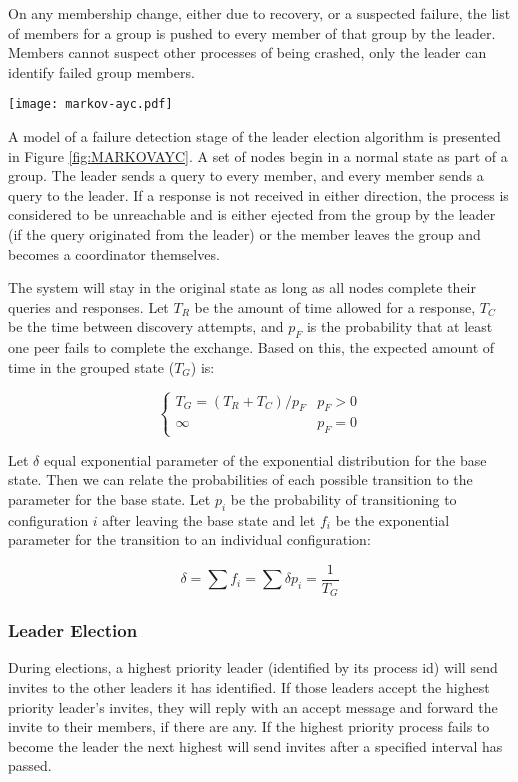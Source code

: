 On any membership change, either due to recovery, or a suspected failure, the list of members for a group is pushed to every member of that group by the leader. Members cannot suspect other processes of being crashed, only the leader can identify failed group members.

\begin{figure*}
\centering
\texttt{[image: markov-ayc.pdf]}
\caption{A diagram showing a partial Markov chain for failure detection}
\label{fig:MARKOVAYC}
\end{figure*}

A model of a failure detection stage of the leader election algorithm is presented in Figure \ref{fig:MARKOVAYC}. A set of nodes begin in a normal state as part of a group. The leader sends a query to every member, and every member sends a query to the leader. If a response is not received in either direction, the process is considered to be unreachable and is either ejected from the group by the leader (if the query originated from the leader) or the member leaves the group and becomes a coordinator themselves.

The system will stay in the original state as long as all nodes complete their queries and responses. Let $T_{R}$ be the amount of time allowed for a response, $T_{C}$ be the time between discovery attempts, and $p_{F}$ is the probability that at least one peer fails to complete the exchange. Based on this, the expected amount of time in the grouped state ($T_{G}$) is:

\begin{equation}
\begin{cases}
T_{G} = ( T_{R}+T_{C}  ) / p_{F} & p_{F} > 0 \\
\infty & p_{F} = 0
\end{cases}
\end{equation}

Let $\delta$ equal exponential parameter of the exponential distribution for the base state. Then we can relate the probabilities of each possible transition to the parameter for the base state. Let $p_{i}$ be the probability of transitioning to configuration $i$ after leaving the base state and let $f_{i}$ be the exponential parameter for the transition to an individual configuration:

\begin{equation}
\delta = \sum f_{i} = \sum \delta p_{i} = \frac{1}{T_{G}}
\end{equation}

\subsubsection{Leader Election}
During elections, a highest priority leader (identified by its process id) will send invites to the other leaders it has identified. If those leaders accept the highest priority leader's invites, they will reply with an accept message and forward the invite to their members, if there are any. If the highest priority process fails to become the leader the next highest will send invites after a specified interval has passed.

